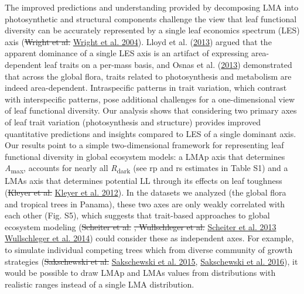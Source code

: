 \documentclass[
  12pt,
]{article}
\providecommand{\DIFaddtex}[1]{{\protect\color{blue}\uwave{#1}}} %
\providecommand{\DIFdeltex}[1]{{\protect\color{red}\sout{#1}}}                      %
\providecommand{\DIFaddbegin}{} %
\providecommand{\DIFaddend}{} %
\providecommand{\DIFdelbegin}{} %
\providecommand{\DIFdelend}{} %
\providecommand{\DIFadd}[1]{\texorpdfstring{\DIFaddtex{#1}}{#1}} %
\providecommand{\DIFdel}[1]{\texorpdfstring{\DIFdeltex{#1}}{}} %
\newcommand{\DIFscaledelfig}{0.5}
\newlength{\DIFdelgraphicswidth} %
\newlength{\DIFdelgraphicsheight} %
\newcommand{\DIFaddincludegraphics}[2][]{{\color{blue}\fbox{\DIFOincludegraphics[#1]{#2}}}} %
\newcommand{\DIFdelincludegraphics}[2][]{%
\sbox{\DIFdelgraphicsbox}{\DIFOincludegraphics[#1]{#2}}%
\settoboxwidth{\DIFdelgraphicswidth}{\DIFdelgraphicsbox} %
\settoboxtotalheight{\DIFdelgraphicsheight}{\DIFdelgraphicsbox} %
\scalebox{\DIFscaledelfig}{%
\parbox[b]{\DIFdelgraphicswidth}{\usebox{\DIFdelgraphicsbox}\\[-\baselineskip] \rule{\DIFdelgraphicswidth}{0em}}\llap{\resizebox{\DIFdelgraphicswidth}{\DIFdelgraphicsheight}{%
\setlength{\unitlength}{\DIFdelgraphicswidth}%
\begin{picture}(1,1)%
\thicklines\linethickness{2pt} %
{\color[rgb]{1,0,0}\put(0,0){\framebox(1,1){}}}%
{\color[rgb]{1,0,0}\put(0,0){\line( 1,1){1}}}%
{\color[rgb]{1,0,0}\put(0,1){\line(1,-1){1}}}%
\end{picture}%
}\hspace*{3pt}}} %
} %
\DeclareRobustCommand{\DIFaddbegin}{\DIFOaddbegin \let\includegraphics\DIFaddincludegraphics} %
\DeclareRobustCommand{\DIFaddend}{\DIFOaddend \let\includegraphics\DIFOincludegraphics} %
\DeclareRobustCommand{\DIFdelbegin}{\DIFOdelbegin \let\includegraphics\DIFdelincludegraphics} %
\DeclareRobustCommand{\DIFdelend}{\DIFOaddend \let\includegraphics\DIFOincludegraphics} %
\begin{document}
The improved predictions and understanding provided by decomposing LMA into photosynthetic and structural components challenge the view that leaf functional diversity can be accurately represented by a single leaf economics spectrum (LES) axis (\DIFdelbegin \DIFdel{Wright et al. }\DIFdelend \protect\DIFdelbegin %
\DIFdelend \DIFaddbegin \hyperlink{ref-Wright2004a}{Wright et al. 2004}\DIFaddend ).
Lloyd et al. (\protect\hyperlink{ref-Lloyd2013}{2013}) argued that the apparent dominance of a single LES axis is an artifact of expressing area-dependent leaf traits on a per-mass basis, and Osnas et al. (\protect\hyperlink{ref-Osnas2013}{2013}) demonstrated that across the global flora, traits related to photosynthesis and metabolism are indeed area-dependent.
Intraspecific patterns in trait variation, which contrast with interspecific patterns, pose additional challenges for a one-dimensional view of leaf functional diversity. Our analysis shows that considering two primary axes of leaf trait variation (photosynthesis and structure) provides improved quantitative predictions and insights compared to LES of a single dominant axis.
Our results point to a simple two-dimensional framework for representing leaf functional diversity in global ecosystem models: a LMAp axis that determines \emph{A}\textsubscript{max}, accounts for nearly all \emph{R}\textsubscript{dark} (see rp and rs estimates in Table S1) and a LMAs axis that determines potential LL through its effects on leaf toughness (\DIFdelbegin \DIFdel{Kleyer et al. }\DIFdelend \protect\DIFdelbegin %
\DIFdelend \DIFaddbegin \hyperlink{ref-Kleyer2012}{Kleyer et al. 2012}\DIFaddend ).
In the datasets we analyzed (the global flora and tropical trees in Panama), these two axes are only weakly correlated with each other (Fig. S5), which suggests that trait-based approaches to global ecosystem modeling (\DIFdelbegin \DIFdel{Scheiter et al. }\DIFdelend \protect\DIFdelbegin %
\DIFdel{, Wullschleger et al. }\DIFdelend \DIFaddbegin \hyperlink{ref-Scheiter2013}{Scheiter et al. 2013}\DIFadd{, }\DIFaddend \protect\DIFdelbegin %
\DIFdelend \DIFaddbegin \hyperlink{ref-Wullschleger2014}{Wullschleger et al. 2014}\DIFaddend ) could consider these as independent axes.
For example, to simulate individual competing trees which from diverse community of growth strategies (\DIFdelbegin \DIFdel{Sakschewski et al. }\DIFdelend \protect\DIFdelbegin %
\DIFdelend \DIFaddbegin \hyperlink{ref-Sakschewski2015}{Sakschewski et al. 2015}\DIFaddend , \protect\DIFdelbegin %
\DIFdelend \DIFaddbegin \hyperlink{ref-Sakschewski2016}{Sakschewski et al. 2016}\DIFaddend ), it would be possible to draw LMAp and LMAs values from distributions with realistic ranges instead of a single LMA distribution.
\end{document}
